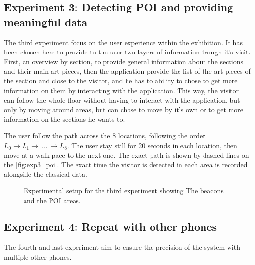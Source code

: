 \subsection{Experiment 3: Detecting POI and providing meaningful data}

The third experiment focus on the user experience within the exhibition. It has been chosen here to provide to the user two layers of information trough it's visit. First, an overview by section, to provide general information about the sections and their main art pieces, then the application provide the list of the art pieces of the section and close to the visitor, and he has to ability to chose to get more information on them by interacting with the application. This way, the visitor can follow the whole floor without having to interact with the application, but only by moving around areas, but can chose to move by it's own or to get more information on the sections he wants to.

The user follow the path across the 8 locations, following the order $L_0 \rightarrow L_1 \rightarrow~...~\rightarrow L_8$. The user stay still for 20 seconds in each location, then move at a walk pace to the next one. The exact path is shown by dashed lines on the \autoref{fig:exp3_poi}. The exact time the visitor is detected in each area is recorded alongside the classical data.

\begin{figure}[H]
    \centering
    \caption{Experimental setup for the third experiment showing The beacons and the POI areas.}
    \label{fig:exp3_poi}
\end{figure}

\subsection{Experiment 4: Repeat with other phones}

The fourth and last experiment aim to ensure the precision of the system with multiple other phones. 